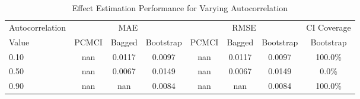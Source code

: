 \begin{table}[htbp]
\centering
\caption{Effect Estimation Performance for Varying Autocorrelation}
\label{tab:auto_performance}
\begin{tabular}{l|ccc|ccc|c}
\hline
Autocorrelation & \multicolumn{3}{c|}{MAE} & \multicolumn{3}{c|}{RMSE} & CI Coverage \\
 Value & PCMCI & Bagged & Bootstrap & PCMCI & Bagged & Bootstrap & Bootstrap \\
\hline
0.10 & nan & 0.0117 & 0.0097 & nan & 0.0117 & 0.0097 & 100.0\% \\
0.50 & nan & 0.0067 & 0.0149 & nan & 0.0067 & 0.0149 & 0.0\% \\
0.90 & nan & nan & 0.0084 & nan & nan & 0.0084 & 100.0\% \\
\hline
\end{tabular}
\end{table}
